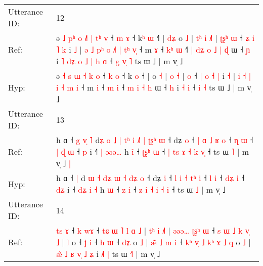 \documentclass[10pt]{article}
\DeclareRobustCommand{\hl}[1]{{\textcolor{red}{#1}}}
\begin{document}
\begin{longtable}{ll}
 \\
\midrule
Utterance ID: & 12 \\
Ref: & ə\hl{ }\hl{˩} \hl{p}\hl{ʰ} \hl{o} \hl{˩}\hl{˥} \hl{|} \hl{t}\hl{ʰ} \hl{v}\hl{̩} ˧ \hl{m} \hl{ɤ} ˧ k\hl{ʰ} \hl{ɯ} ˧\hl{˥} |\hl{ }\hl{d}\hl{ʑ} o \hl{˩} |\hl{ }\hl{t}\hl{ʰ} \hl{i} \hl{˩}\hl{˥} |\hl{ }\hl{ʈ}\hl{ʂ}\hl{ʰ} \hl{ɯ} ˧ \hl{ʑ} \hl{i} \hl{˥} \hl{k} i \hl{˩} |\hl{ }\hl{ə} \hl{˩} \hl{p}\hl{ʰ} \hl{o} \hl{˩}\hl{˥} \hl{|} \hl{t}\hl{ʰ} \hl{v}\hl{̩} ˧ m \hl{ɤ} ˧ \hl{k}\hl{ʰ} \hl{ɯ} ˧\hl{˥}\hl{ }\hl{|}\hl{ }\hl{d}\hl{ʑ} \hl{o} \hl{˩} \hl{|} \hl{ɖ} ɯ ˧ \hl{ɲ} i\hl{ }\hl{˥}\hl{ }\hl{d}\hl{ʑ}\hl{ }\hl{o}\hl{ }\hl{˩}\hl{ }\hl{|} \hl{h} \hl{ɑ} ˧\hl{ }\hl{g} \hl{v}\hl{̩} \hl{˥} ts ɯ ˩ | m v̩ ˩
 \\
Hyp: & ə\hl{}\hl{} \hl{}\hl{˧} \hl{s} \hl{}\hl{ɯ} \hl{˧} \hl{}\hl{k} \hl{}\hl{o} ˧ \hl{k} \hl{o} ˧ k\hl{} \hl{o} ˧\hl{} |\hl{}\hl{}\hl{} o \hl{˧} |\hl{}\hl{}\hl{} \hl{o} \hl{}\hl{˧} |\hl{}\hl{}\hl{}\hl{} \hl{o} ˧ \hl{|} \hl{o} \hl{˧} \hl{|} i \hl{˧} |\hl{}\hl{} \hl{i} \hl{}\hl{˧} \hl{|} \hl{}\hl{i} \hl{˧} \hl{}\hl{m} \hl{}\hl{i} ˧ m \hl{i} ˧ \hl{}\hl{m} \hl{i} ˧\hl{}\hl{}\hl{}\hl{}\hl{}\hl{} \hl{m} \hl{i} \hl{˧} \hl{h} ɯ ˧ \hl{h} i\hl{}\hl{}\hl{}\hl{}\hl{}\hl{}\hl{}\hl{}\hl{}\hl{}\hl{} \hl{˧} \hl{i} ˧\hl{}\hl{} \hl{}\hl{i} \hl{˧} ts ɯ ˩ | m v̩ ˩
 \\
\midrule
Utterance ID: & 13 \\
Ref: & h ɑ ˧\hl{ }\hl{g}\hl{ }\hl{v}\hl{̩} \hl{˥} d\hl{ʑ}\hl{ }\hl{o} \hl{˩} \hl{|} \hl{t}\hl{ʰ}\hl{ }\hl{i} \hl{˩}\hl{˥} \hl{|} \hl{ʈ}\hl{ʂ}\hl{ʰ} \hl{ɯ} ˧ dʑ \hl{o} ˧ \hl{|} \hl{ɑ} \hl{˩} \hl{}\hl{ʁ} \hl{o} ˧ \hl{ɳ} \hl{ɯ} ˧ \hl{|}\hl{ }\hl{ɖ} \hl{ɯ} ˧ \hl{}\hl{p} i ˧\hl{˥} \hl{|}\hl{ }\hl{ə}\hl{ə}\hl{ə}\hl{…} h \hl{i}\hl{̃} ˧ \hl{ʈ}\hl{ʂ}\hl{ʰ} \hl{ɯ} ˧ \hl{|} \hl{t}\hl{s} \hl{ɤ} \hl{˧} \hl{k} \hl{v}\hl{̩} ˧ ts ɯ \hl{˥} | m v̩ ˩\hl{ }\hl{|}
 \\
Hyp: & h ɑ ˧\hl{}\hl{}\hl{}\hl{}\hl{} \hl{|} d\hl{}\hl{}\hl{} \hl{ɯ} \hl{˧} \hl{}\hl{}\hl{d}\hl{ʑ} \hl{}\hl{ɯ} \hl{˧} \hl{}\hl{d}\hl{ʑ} \hl{o} ˧ dʑ \hl{i} ˧ \hl{l} \hl{i} \hl{˧} \hl{t}\hl{ʰ} \hl{i} ˧ \hl{l} \hl{i} ˧ \hl{}\hl{d}\hl{ʑ} \hl{i} ˧ \hl{d}\hl{ʑ} i ˧\hl{} \hl{d}\hl{ʑ}\hl{ }\hl{i}\hl{ }\hl{˧} h \hl{}\hl{ɯ} ˧ \hl{}\hl{}\hl{z} \hl{i} ˧ \hl{z} \hl{}\hl{i} \hl{˧} \hl{i} \hl{˧} \hl{}\hl{i} ˧ ts ɯ \hl{˩} | m v̩ ˩\hl{}\hl{}
 \\
\midrule
Utterance ID: & 14 \\
Ref: & \hl{t}\hl{s} \hl{ɤ} ˧ \hl{k} \hl{w}\hl{ɤ} ˧ \hl{t}\hl{ɕ} \hl{ɯ} \hl{˥} \hl{l} \hl{ɑ} \hl{˩} |\hl{ }\hl{t}\hl{ʰ} \hl{i} \hl{˩}\hl{˥} |\hl{ }\hl{ə}\hl{ə}\hl{ə}\hl{…}\hl{ }\hl{ʈ}\hl{ʂ}\hl{ʰ} \hl{ɯ} ˧ \hl{s} \hl{ɯ} \hl{˩} \hl{k} \hl{v}\hl{̩} \hl{˩} |\hl{ }\hl{l} o ˧ \hl{ʝ} \hl{i} ˧ \hl{h} \hl{ɯ} ˧ \hl{d}\hl{ʑ} o \hl{˩} | \hl{æ}\hl{̃} \hl{˩} \hl{m} \hl{i} ˧ \hl{k}\hl{ʰ} \hl{v}\hl{̩} \hl{˩} \hl{k}\hl{ʰ} \hl{ɤ} \hl{˩} \hl{q} o \hl{˩} |\hl{ }\hl{æ}\hl{̃}\hl{ }\hl{˩} \hl{ʁ} \hl{v}\hl{̩} \hl{˩} \hl{ʑ} i\hl{ }\hl{˩}\hl{˥} \hl{|} ts ɯ \hl{˧}\hl{˥} | m v̩ ˩

\end{longtable}
\end{document}
